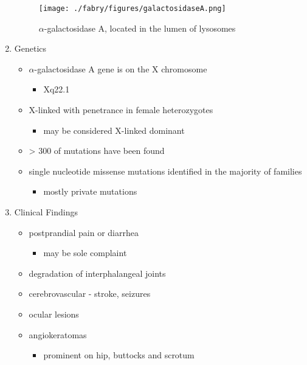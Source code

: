 \documentclass{scrartcl}
\begin{document}
\begin{enumerate}
\begin{figure}[htbp]
\centering
\texttt{[image: ./fabry/figures/galactosidaseA.png]}
\caption[\(\alpha\)-galactosidase A]{\label{fig:org4f28a16}
\(\alpha\)-galactosidase A, located in the lumen of lysosomes}
\end{figure}

\item Genetics
\label{sec:org4680888}
\begin{itemize}
\item \(\alpha\)-galactosidase A gene is on the X chromosome
\begin{itemize}
\item Xq22.1
\end{itemize}
\item X-linked with penetrance in female heterozygotes
\begin{itemize}
\item may be considered X-linked dominant
\end{itemize}
\item \textgreater{} 300 of mutations have been found
\item single nucleotide missense mutations identified in the majority of families
\begin{itemize}
\item mostly private mutations
\end{itemize}
\end{itemize}

\item Clinical Findings
\label{sec:org5113fe7}

\begin{itemize}
\item postprandial pain or diarrhea
\begin{itemize}
\item may be sole complaint
\end{itemize}
\item degradation of interphalangeal joints
\item cerebrovascular - stroke, seizures
\item ocular lesions
\item angiokeratomas
\begin{itemize}
\item prominent on hip, buttocks and scrotum
\end{itemize}
\end{itemize}


\end{enumerate}
\end{document}
